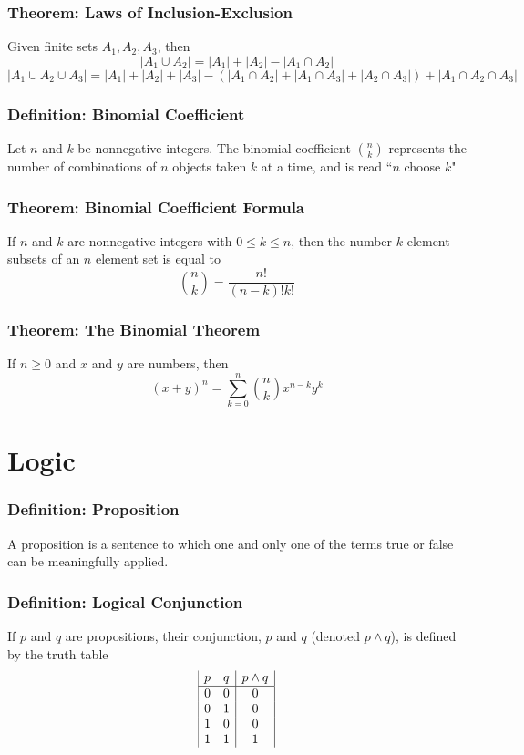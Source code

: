 \documentclass{article}
\begin{document}
\subsubsection*{Theorem: Laws of Inclusion-Exclusion}
Given finite sets $A_1, A_2, A_3$, then
$$|A_1 \cup A_2| = |A_1| + |A_2| - |A_1 \cap A_2|$$
$$|A_1 \cup A_2 \cup A_3 | = |A_1| +|A_2| + |A_3| - (|A_1 \cap A_2 | + |A_1 \cap A_3 | + |A_2 \cap A_3|) + |A_1 \cap A_2 \cap A_3|$$

\subsubsection*{Definition: Binomial Coefficient}
Let $n$ and $k$ be nonnegative integers. The binomial coefficient $\binom{n}{k}$ represents the number of combinations of $n$ objects taken $k$ at a time, and is read ``$n$ choose $k$"

\subsubsection*{Theorem: Binomial Coefficient Formula}
If $n$ and $k$ are nonnegative integers with $0\leq k \leq n$, then the number $k$-element subsets of an $n$ element set is equal to 
$$\binom{n}{k} = \frac{n!}{(n-k)!k!}$$

\subsubsection*{Theorem: The Binomial Theorem}
If $n \geq 0$ and $x$ and $y$ are numbers, then
$$(x+y)^n = \sum^{n}_{k=0} \binom{n}{k} x^{n-k} y^k$$

\section{Logic}
\subsubsection*{Definition: Proposition}
A proposition is a sentence to which one and only one of the terms true or false can be meaningfully applied. 

\subsubsection*{Definition: Logical Conjunction}
If $p$ and $q$ are propositions, their conjunction, $p$ and $q$ (denoted $p \land q$), is defined by the truth table
$$\begin{array}{|c c|c|}
p & q & p \land q\\ %
\hline %
0 & 0 & 0\\
0 & 1 & 0\\
1 & 0 & 0\\
1 & 1 & 1\\
\end{array}$$
\end{document}
